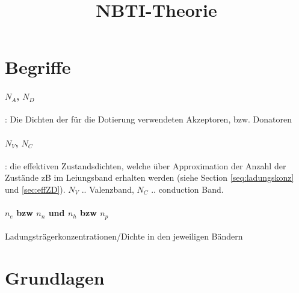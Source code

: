 \documentclass[paper=a4,10pt]{scrartcl}
\begin{document}
\title{NBTI-Theorie}
\section{Begriffe}
\paragraph{$N_A$, $N_D$}: Die Dichten der für die Dotierung verwendeten Akzeptoren, bzw. Donatoren
\paragraph{$N_V$, $N_C$}: die effektiven Zustandsdichten, welche über Approximation der Anzahl der Zustände zB im Leiungsband erhalten werden (siehe Section \ref{seq:ladungskonz} und \ref{sec:effZD}). $N_V$ .. Valenzband, $N_C$ .. conduction Band.
\paragraph{$n_e$ bzw $n_n$ und $n_h$ bzw $n_p$} Ladungsträgerkonzentrationen/Dichte in den jeweiligen Bändern


\section{Grundlagen}
\end{document}
